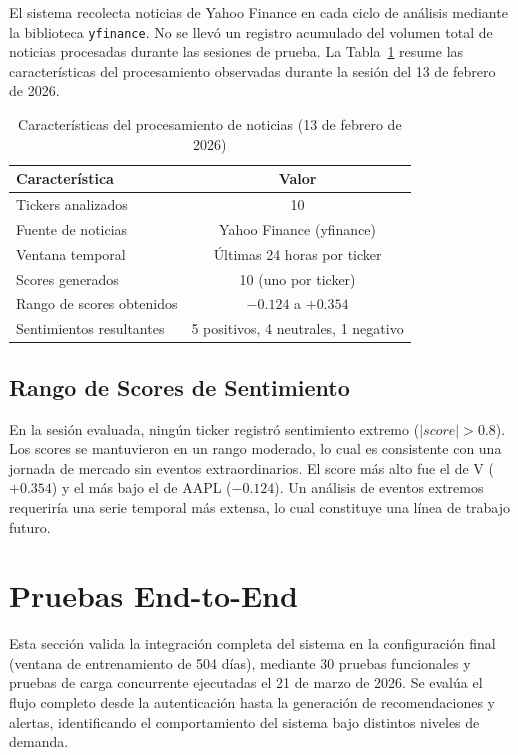   El sistema recolecta noticias de Yahoo Finance en cada ciclo de análisis mediante la        
  biblioteca \texttt{yfinance}. No se llevó un registro acumulado del volumen total de        
  noticias procesadas durante las sesiones de prueba. La Tabla~\ref{tab:noticias} resume las  
  características del procesamiento observadas durante la sesión del 13 de febrero de 2026.   

  \begin{table}[H]
  \centering
  \caption{Características del procesamiento de noticias (13 de febrero de 2026)}
  \label{tab:noticias}
  \begin{tabular}{lc}
  \toprule
  \textbf{Característica} & \textbf{Valor} \\
  \midrule
  Tickers analizados & 10 \\
  Fuente de noticias & Yahoo Finance (yfinance) \\
  Ventana temporal & Últimas 24 horas por ticker \\
  Scores generados & 10 (uno por ticker) \\
  Rango de scores obtenidos & $-0.124$ a $+0.354$ \\
  Sentimientos resultantes & 5 positivos, 4 neutrales, 1 negativo \\
  \bottomrule
  \end{tabular}
  \end{table}

  \subsection{Rango de Scores de Sentimiento}

  En la sesión evaluada, ningún ticker registró sentimiento extremo ($|score| > 0.8$). Los    
  scores se mantuvieron en un rango moderado, lo cual es consistente con una jornada de       
  mercado sin eventos extraordinarios. El score más alto fue el de V ($+0.354$) y el más bajo 
  el de AAPL ($-0.124$). Un análisis de eventos extremos requeriría una serie temporal más    
  extensa, lo cual constituye una línea de trabajo futuro.
  
\section{Pruebas End-to-End}

  Esta sección valida la integración completa del sistema en la configuración final (ventana de
  entrenamiento de 504 días), mediante 30 pruebas funcionales y pruebas de carga concurrente
  ejecutadas el 21 de marzo de 2026. Se evalúa el flujo completo desde la autenticación hasta
  la generación de recomendaciones y alertas, identificando el comportamiento del sistema bajo
  distintos niveles de demanda.

